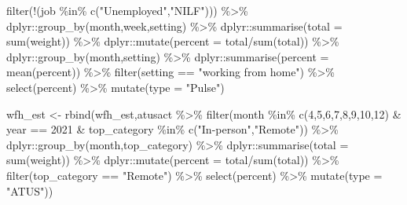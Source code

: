 \documentclass[
]{article}
\newenvironment{Shaded}{\begin{snugshade}}{\end{snugshade}}
\newcommand{\AttributeTok}[1]{\textcolor[rgb]{0.77,0.63,0.00}{#1}}
\newcommand{\DecValTok}[1]{\textcolor[rgb]{0.00,0.00,0.81}{#1}}
\newcommand{\FunctionTok}[1]{\textcolor[rgb]{0.00,0.00,0.00}{#1}}
\newcommand{\NormalTok}[1]{#1}
\newcommand{\OtherTok}[1]{\textcolor[rgb]{0.56,0.35,0.01}{#1}}
\newcommand{\SpecialCharTok}[1]{\textcolor[rgb]{0.00,0.00,0.00}{#1}}
\newcommand{\StringTok}[1]{\textcolor[rgb]{0.31,0.60,0.02}{#1}}
\begin{document}
\begin{Shaded}
\begin{Highlighting}[]
  \FunctionTok{filter}\NormalTok{(}\SpecialCharTok{!}\NormalTok{(job }\SpecialCharTok{\%in\%} \FunctionTok{c}\NormalTok{(}\StringTok{"Unemployed"}\NormalTok{,}\StringTok{"NILF"}\NormalTok{))) }\SpecialCharTok{\%\textgreater{}\%}
\NormalTok{  dplyr}\SpecialCharTok{::}\FunctionTok{group\_by}\NormalTok{(month,week,setting) }\SpecialCharTok{\%\textgreater{}\%}
\NormalTok{  dplyr}\SpecialCharTok{::}\FunctionTok{summarise}\NormalTok{(}\AttributeTok{total =} \FunctionTok{sum}\NormalTok{(weight)) }\SpecialCharTok{\%\textgreater{}\%}
\NormalTok{  dplyr}\SpecialCharTok{::}\FunctionTok{mutate}\NormalTok{(}\AttributeTok{percent =}\NormalTok{ total}\SpecialCharTok{/}\FunctionTok{sum}\NormalTok{(total)) }\SpecialCharTok{\%\textgreater{}\%}
\NormalTok{  dplyr}\SpecialCharTok{::}\FunctionTok{group\_by}\NormalTok{(month,setting) }\SpecialCharTok{\%\textgreater{}\%}
\NormalTok{  dplyr}\SpecialCharTok{::}\FunctionTok{summarise}\NormalTok{(}\AttributeTok{percent =} \FunctionTok{mean}\NormalTok{(percent)) }\SpecialCharTok{\%\textgreater{}\%}
  \FunctionTok{filter}\NormalTok{(setting }\SpecialCharTok{==} \StringTok{"working from home"}\NormalTok{) }\SpecialCharTok{\%\textgreater{}\%}
  \FunctionTok{select}\NormalTok{(percent) }\SpecialCharTok{\%\textgreater{}\%}
  \FunctionTok{mutate}\NormalTok{(}\AttributeTok{type =} \StringTok{"Pulse"}\NormalTok{)}
\end{Highlighting}
\end{Shaded}

\begin{Shaded}
\begin{Highlighting}[]
\NormalTok{wfh\_est }\OtherTok{\textless{}{-}} \FunctionTok{rbind}\NormalTok{(wfh\_est,atusact }\SpecialCharTok{\%\textgreater{}\%}
  \FunctionTok{filter}\NormalTok{(month }\SpecialCharTok{\%in\%} \FunctionTok{c}\NormalTok{(}\DecValTok{4}\NormalTok{,}\DecValTok{5}\NormalTok{,}\DecValTok{6}\NormalTok{,}\DecValTok{7}\NormalTok{,}\DecValTok{8}\NormalTok{,}\DecValTok{9}\NormalTok{,}\DecValTok{10}\NormalTok{,}\DecValTok{12}\NormalTok{) }\SpecialCharTok{\&}\NormalTok{ year }\SpecialCharTok{==} \DecValTok{2021} \SpecialCharTok{\&}\NormalTok{ top\_category }\SpecialCharTok{\%in\%} \FunctionTok{c}\NormalTok{(}\StringTok{"In{-}person"}\NormalTok{,}\StringTok{"Remote"}\NormalTok{)) }\SpecialCharTok{\%\textgreater{}\%}
\NormalTok{  dplyr}\SpecialCharTok{::}\FunctionTok{group\_by}\NormalTok{(month,top\_category) }\SpecialCharTok{\%\textgreater{}\%}
\NormalTok{  dplyr}\SpecialCharTok{::}\FunctionTok{summarise}\NormalTok{(}\AttributeTok{total =} \FunctionTok{sum}\NormalTok{(weight)) }\SpecialCharTok{\%\textgreater{}\%}
\NormalTok{  dplyr}\SpecialCharTok{::}\FunctionTok{mutate}\NormalTok{(}\AttributeTok{percent =}\NormalTok{ total}\SpecialCharTok{/}\FunctionTok{sum}\NormalTok{(total)) }\SpecialCharTok{\%\textgreater{}\%}
  \FunctionTok{filter}\NormalTok{(top\_category }\SpecialCharTok{==} \StringTok{"Remote"}\NormalTok{) }\SpecialCharTok{\%\textgreater{}\%}
  \FunctionTok{select}\NormalTok{(percent) }\SpecialCharTok{\%\textgreater{}\%}
  \FunctionTok{mutate}\NormalTok{(}\AttributeTok{type =} \StringTok{"ATUS"}\NormalTok{))}
\end{Highlighting}
\end{Shaded}
\end{document}
